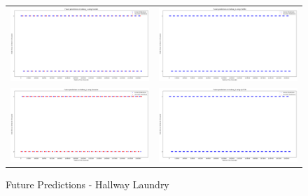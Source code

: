 \begin{figure}
  \begin{tabular}{cc}
    {\includegraphics[width = 3in]{images/results/Future_hallway_L_Duckett.png}} &
    {\includegraphics[width = 3in]{images/results/Future_hallway_L_FreMEn.png}} \\
    {\includegraphics[width = 3in]{images/results/Future_hallway_L_Gaussian.png}} &
    {\includegraphics[width = 3in]{images/results/Future_hallway_L_HyT-EM.png}} \\
  \end{tabular}
  \caption{Future Predictions - Hallway Laundry}
\end{figure}

